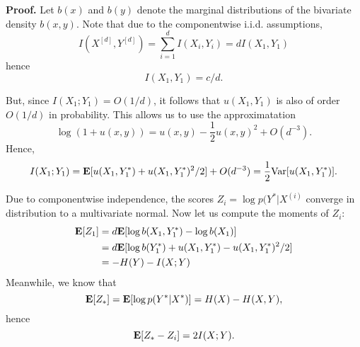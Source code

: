 \documentclass[12pt]{article}
\begin{document}
\textbf{Proof. }
Let $b(x)$ and $b(y)$ denote the marginal distributions of the bivariate density $b(x, y)$.
Note that due to the componentwise i.i.d. assumptions,
\[
I(X^{[d]}, Y^{[d]}) = \sum_{i=1}^d I(X_i, Y_i) = d I(X_1,Y_1)
\]
hence
\[
I(X_1,Y_1) = c/d.
\]



But, since $I(X_1; Y_1) = O(1/d)$, it follows that $u(X_1, Y_1)$ is
also of order $O(1/d)$ in probability.
This allows us to use the approximatation
\[
\log(1 + u(x, y)) = u(x, y) - \frac{1}{2}u(x,y)^2 + O(d^{-3}).
\]
Hence,
\[
I(X_1; Y_1) = \textbf{E}[u(X_1, Y_1^*) + u(X_1, Y_1^*)^2/2] + O(d^{-3}) = \frac{1}{2}\text{Var}[u(X_1,Y_1^*)].
\]

Due to componentwise independence, the scores $Z_i = \log p(Y^*|X^{(i)}$ converge in distribution to a multivariate normal.
Now let us compute the moments of $Z_i$:
\begin{align*}
\textbf{E}[Z_1] &= d\textbf{E}[\log b(X_1, Y_1^*) - \log b(X_1)]
\\&= d \textbf{E}[\log b(Y_1^*) + u(X_1,Y_1^*) - u(X_1, Y_1^*)^2/2]
\\&= -H(Y) - I(X; Y)
\end{align*}
Meanwhile, we know that
\[
\textbf{E}[Z_*] = \textbf{E}[\log p(Y^*|X^*)] = H(X) - H(X, Y),
\]
hence
\[
\textbf{E}[Z_* - Z_i] = 2 I(X; Y).
\]
\end{document}
